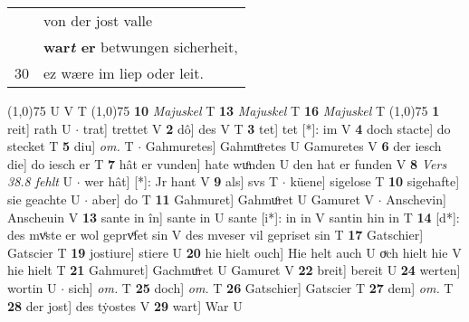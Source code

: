\documentclass[8pt,a4paper,notitlepage]{article}
\begin{document}
\begin{table}[ht]
\begin{minipage}[t]{0.5\linewidth}
\begin{tabular}{rl}
 & von der jost valle\\ 
 & \textbf{war\textit{t} er} betwungen sicherheit,\\ 
30 & ez wære im liep oder leit.\\ 
\end{tabular}
\scriptsize
\line(1,0){75} \newline
U V T \newline
\line(1,0){75} \newline
\textbf{10} \textit{Majuskel} T  \textbf{13} \textit{Majuskel} T  \textbf{16} \textit{Majuskel} T  \newline
\line(1,0){75} \newline
\textbf{1} reit] rath U  $\cdot$ trat] trettet V \textbf{2} dô] des V T \textbf{3} tet] tet [*]: im V \textbf{4} doch stacte] do stecket T \textbf{5} diu] \textit{om.} T  $\cdot$ Gahmuretes] Gahmuͦretes U Gamuretes V \textbf{6} der iesch die] do iesch er T \textbf{7} hât er vunden] hate wuͦnden U den hat er funden V \textbf{8} \textit{Vers 38.8 fehlt} U   $\cdot$ wer hât] [*]: Jr hant V \textbf{9} als] svs T  $\cdot$ küene] sigelose T \textbf{10} sigehafte] sie geachte U  $\cdot$ aber] do T \textbf{11} Gahmuret] Gahmuͦret U Gamuret V  $\cdot$ Anschevin] Anscheuin V \textbf{13} sante in în] sante in U sante [i*]: in in V santin hin in T \textbf{14} [d*]: des mvͤste er wol geprvͤfet sin V des mveser vil gepriset sin T \textbf{17} Gatschier] Gatscier T \textbf{19} jostiure] stiere U \textbf{20} hie hielt ouch] Hie helt auch U oͮch hielt hie V hie hielt T \textbf{21} Gahmuret] Gachmuͦret U Gamuret V \textbf{22} breit] bereit U \textbf{24} werten] wortin U  $\cdot$ sich] \textit{om.} T \textbf{25} doch] \textit{om.} T \textbf{26} Gatschier] Gatscier T \textbf{27} dem] \textit{om.} T \textbf{28} der jost] des tẏostes V \textbf{29} wart] War U \newline
\end{minipage}
\end{table}
\end{document}
